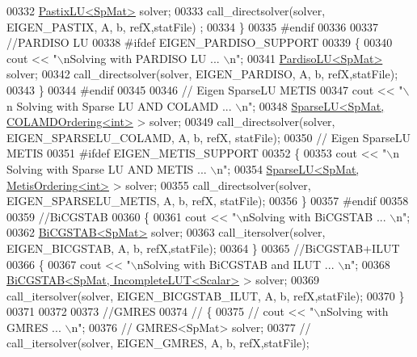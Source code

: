 \begin{DoxyCode}
00332     \hyperlink{class_eigen_1_1_pastix_l_u}{PastixLU<SpMat>} solver; 
00333     call\_directsolver(solver, EIGEN\_PASTIX, A, b, refX,statFile) ;
00334   \}
00335 \textcolor{preprocessor}{  #endif}
00336 
00337    \textcolor{comment}{//PARDISO LU}
00338 \textcolor{preprocessor}{  #ifdef EIGEN\_PARDISO\_SUPPORT}
00339   \{
00340     cout << \textcolor{stringliteral}{"\(\backslash\)nSolving with PARDISO LU ... \(\backslash\)n"}; 
00341     \hyperlink{class_eigen_1_1_pardiso_l_u}{PardisoLU<SpMat>}  solver; 
00342     call\_directsolver(solver, EIGEN\_PARDISO, A, b, refX,statFile);
00343   \}
00344 \textcolor{preprocessor}{  #endif}
00345   
00346   \textcolor{comment}{// Eigen SparseLU METIS}
00347   cout << \textcolor{stringliteral}{"\(\backslash\)n Solving with Sparse LU AND COLAMD ... \(\backslash\)n"};
00348   \hyperlink{group___sparse_l_u___module_class_eigen_1_1_sparse_l_u}{SparseLU<SpMat, COLAMDOrdering<int>} >   solver;
00349   call\_directsolver(solver, EIGEN\_SPARSELU\_COLAMD, A, b, refX, statFile); 
00350   \textcolor{comment}{// Eigen SparseLU METIS}
00351 \textcolor{preprocessor}{  #ifdef EIGEN\_METIS\_SUPPORT}
00352   \{
00353     cout << \textcolor{stringliteral}{"\(\backslash\)n Solving with Sparse LU AND METIS ... \(\backslash\)n"};
00354     \hyperlink{group___sparse_l_u___module_class_eigen_1_1_sparse_l_u}{SparseLU<SpMat, MetisOrdering<int>} >   solver;
00355     call\_directsolver(solver, EIGEN\_SPARSELU\_METIS, A, b, refX, statFile); 
00356   \}
00357 \textcolor{preprocessor}{  #endif}
00358   
00359   \textcolor{comment}{//BiCGSTAB}
00360   \{
00361     cout << \textcolor{stringliteral}{"\(\backslash\)nSolving with BiCGSTAB ... \(\backslash\)n"}; 
00362     \hyperlink{group___iterative_linear_solvers___module_class_eigen_1_1_bi_c_g_s_t_a_b}{BiCGSTAB<SpMat>} solver; 
00363     call\_itersolver(solver, EIGEN\_BICGSTAB, A, b, refX,statFile);
00364   \}
00365   \textcolor{comment}{//BiCGSTAB+ILUT}
00366   \{
00367     cout << \textcolor{stringliteral}{"\(\backslash\)nSolving with BiCGSTAB and ILUT ... \(\backslash\)n"}; 
00368     \hyperlink{group___iterative_linear_solvers___module_class_eigen_1_1_bi_c_g_s_t_a_b}{BiCGSTAB<SpMat, IncompleteLUT<Scalar>} > solver; 
00369     call\_itersolver(solver, EIGEN\_BICGSTAB\_ILUT, A, b, refX,statFile); 
00370   \}
00371   
00372    
00373   \textcolor{comment}{//GMRES}
00374 \textcolor{comment}{//   \{}
00375 \textcolor{comment}{//     cout << "\(\backslash\)nSolving with GMRES ... \(\backslash\)n"; }
00376 \textcolor{comment}{//     GMRES<SpMat> solver; }
00377 \textcolor{comment}{//     call\_itersolver(solver, EIGEN\_GMRES, A, b, refX,statFile); }

\end{DoxyCode}
